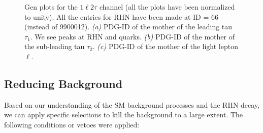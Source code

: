 \documentclass[letterpaper,12pt]{article}
\begin{document}
\vspace{0.7cm}
\begin{figure}[h]
\centering
{}%
\quad
{}%
\quad
{}%
\quad

\caption{Gen plots for the $1\ell2\tau$ channel (all the plots have been normalized to unity). All the entries for RHN have been made at ID = 66 (instead of 9900012). \emph{(a)} PDG-ID of the mother of the leading tau $\tau_{1}$. We see peaks at RHN and quarks. \emph{(b)} PDG-ID of the mother of the sub-leading tau $\tau_{2}$. \emph{(c)} PDG-ID of the mother of the light lepton $\ell$.}
\label{fig:1l2tgen}  
\end{figure}

\subsection{Reducing Background}
\label{sec:reducebkg}

Based on our understanding of the SM background processes and the RHN decay, we can apply specific selections to kill the background to a large extent. The following conditions or vetoes were applied:
\end{document}
